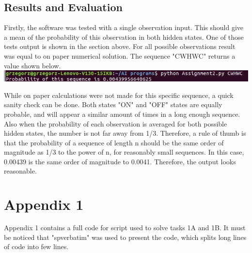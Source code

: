 \documentclass[10pt]{article}
\begin{document}
\subsection{Results and Evaluation}
Firstly, the software was tested with a single observation input. This should give a mean of the probability of this observation in both hidden states. One of those tests output is shown in the section above. For all possible observations result was equal to on paper numerical solution. The sequence "CWHWC" returns a value shown below.\newline
\includegraphics[width=\textwidth]{UserManual4.jpg}
\newline

While on paper calculations were not made for this specific sequence, a quick sanity check can be done. Both states "ON" and "OFF" states are equally probable, and will appear a similar amount of times in a long enough sequence. Also when the probability of each observation is averaged for both possible hidden states, the number is not far away from 1/3. Therefore, a rule of thumb is that the probability of a sequence of length n should be the same order of magnitude as 1/3 to the power of n, for reasonably small sequences. In this case, 0.00439 is the same order of magnitude to 0.0041. Therefore, the output looks reasonable.
\newpage




\newpage
\section{Appendix 1}
Appendix 1 contains a full code for script used to solve tasks 1A and 1B. It must be noticed that "spverbatim" was used to present the code, which splits long lines of code into few lines.
\end{document}
